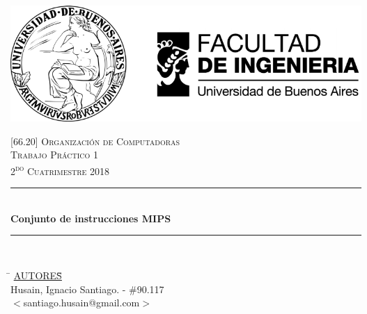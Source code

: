 

\pagestyle{fancy}
\begin{titlepage}
	\newcommand{\HRule}{\rule{\linewidth}{0.5mm}} %
	\center %

	\thispagestyle{empty}
	\begin{center}
		\includegraphics[scale=1]{includes/banner_fiuba.pdf}\\
	\end{center}


	\textsc{\LARGE \textsc{[66.20] Organización de Computadoras}}\\[0.5cm]
	\textsc{\Large \textsc{Trabajo Práctico 1}}\\[0.5cm]
	\textsc{\large 2\textsuperscript{do} Cuatrimestre 2018}\\[0.25cm]

	\HRule\\[0.5cm]
	{\huge\bfseries Conjunto de instrucciones MIPS}\\[0.2cm]
	\HRule\\[0.5cm]

	\begin{tabbing}
		\hspace{2cm}\=\+
		\underline{AUTORES}\hspace{-1cm}\=\+\hspace{1cm}\=\hspace{6cm}\=\\[0.2cm]

		Husain, Ignacio Santiago.	\>\>- \#90.117\\
		\>\footnotesize{$<$santiago.husain@gmail.com$>$}\\


\end{tabbing}
\end{titlepage}
